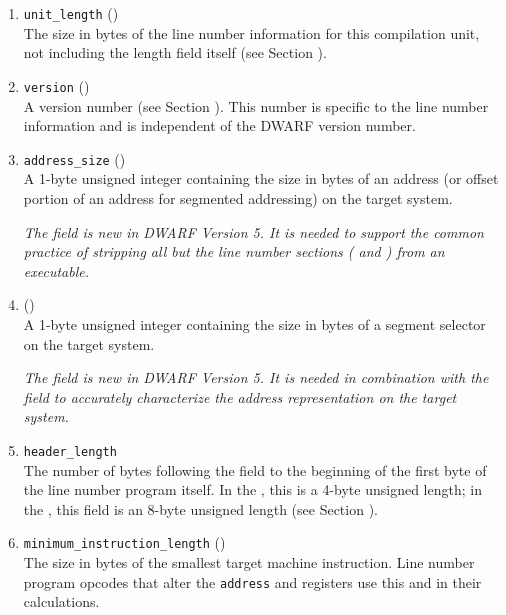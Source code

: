 \begin{enumerate}[1. ]
\item \texttt{unit\_length} ()  \\
The size in bytes of the line number information for this
compilation unit, not including the length field itself
(see Section ). 

\item \texttt{version} (\HFTuhalf) \\
A version number 
(see Section ). 
This number is specific to
the line number information and is independent of the DWARF
version number. 

\item \texttt{address\_size} (\HFTubyte)\\
A 1-byte unsigned integer containing the size in bytes of an
address (or offset portion of an address for segmented addressing)
on the target system.
   
\textit{The  field is new in DWARF Version 5. 
It is needed to support the common practice of stripping all but 
the line number sections (\dotdebugline{} and \dotdebuglinestr{}) 
from an executable.}

\item \HFNsegmentselectorsize{} (\HFTubyte) \\
A 1-byte unsigned integer containing the size in bytes of a segment
selector on the target system.
   
\textit{The \HFNsegmentselectorsize{} field is new in DWARF Version 5. 
It is needed in combination with the  field 
to accurately characterize the address representation on the target 
system.}

\item \texttt{header\_length}  \\
The number of bytes following the  field to the
beginning of the first byte of the line number program itself.
In the \thirtytwobitdwarfformat, this is a 4-byte unsigned
length; in the \sixtyfourbitdwarfformat, this field is an
8-byte unsigned length 
(see Section ). 

\item \texttt{minimum\_instruction\_length} (\HFTubyte)  \\
The size in bytes of the smallest target machine
instruction. Line number program opcodes that alter
the \texttt{address} and 
registers use this and
in their calculations. 


\end{enumerate}
